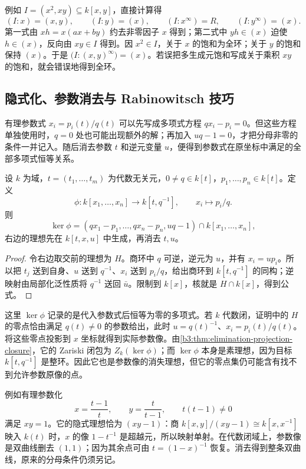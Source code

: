例如 \(I=(x^2,xy)\subseteq k[x,y]\)，直接计算得
\[
	(I:x)=(x,y),\qquad (I:y)=(x),\qquad (I:x^\infty)=R,\qquad (I:y^\infty)=(x).
\]
第一式由 \(xh=x(ax+by)\) 约去非零因子 \(x\) 得到；第二式中 \(yh\in(x)\) 迫使 \(h\in(x)\)，反向由 \(xy\in I\) 得到。因 \(x^2\in I\)，关于 \(x\) 的饱和为全环；关于 \(y\) 的饱和保持 \((x)\)。于是 \(\bigl(I:(x,y)^\infty\bigr)=(x)\)。若误把多生成元饱和写成关于乘积 \(xy\) 的饱和，就会错误地得到全环。

\subsection{隐式化、参数消去与 Rabinowitsch 技巧}
\label{b3:subsec:0803:03}

有理参数式 \(x_i=p_i(t)/q(t)\) 可以先写成多项式方程 \(qx_i-p_i=0\)。但这些方程单独使用时，\(q=0\) 处也可能出现额外的解；再加入 \(uq-1=0\)，才把分母非零的条件一并记入。随后消去参数 \(t\) 和逆元变量 \(u\)，便得到参数式在原坐标中满足的全部多项式恒等关系。

\begin{proposition}[参数映射的隐式理想]\label{b3:prop:parametric-implicit-ideal}
	设 \(k\) 为域，\(t=(t_1,\ldots,t_m)\) 为代数无关元，\(0\ne q\in k[t]\)，\(p_1,\ldots,p_n\in k[t]\)。定义
	\[
		\phi:k[x_1,\ldots,x_n]\longrightarrow k[t,q^{-1}], \qquad x_i\longmapsto p_i/q.
	\]
	则
	\[
		\ker\phi= (qx_1-p_1,\ldots,qx_n-p_n,uq-1)\cap k[x_1,\ldots,x_n],
	\]
	右边的理想先在 \(k[t,x,u]\) 中生成，再消去 \(t,u\)。
\end{proposition}
\begin{proof}
	令右边取交前的理想为 \(H\)。商环中 \(q\) 可逆，逆元为 \(u\)，并有 \(x_i=up_i\)。所以把 \(t_j\) 送到自身、\(u\) 送到 \(q^{-1}\)、\(x_i\) 送到 \(p_i/q\)，给出商环到 \(k[t,q^{-1}]\) 的同构；逆映射由局部化泛性质将 \(q^{-1}\) 送回 \(\bar u\)。限制到 \(k[x]\)，核就是 \(H\cap k[x]\)，得到公式。
\end{proof}

这里 \(\ker\phi\) 记录的是代入参数式后恒等为零的多项式。若 \(k\) 代数闭，证明中的 \(H\) 的零点恰由满足 \(q(t)\ne0\) 的参数给出，此时 \(u=q(t)^{-1}\)、\(x_i=p_i(t)/q(t)\)。将这些零点投影到 \(x\) 坐标就得到实际参数像。由\cref{b3:thm:elimination-projection-closure}，它的 Zariski 闭包为 \(Z_k(\ker\phi)\)；而 \(\ker\phi\) 本身是素理想，因为目标 \(k[t,q^{-1}]\) 是整环。因此它也是参数像的消失理想，但它的零点集仍可能含有找不到允许参数原像的点。

例如有理参数化
\[
	x=\frac{t-1}{t},\qquad y=\frac{t}{t-1},\qquad t(t-1)\ne0
\]
满足 \(xy=1\)。它的隐式理想恰为 \((xy-1)\)：商 \(k[x,y]/(xy-1)\cong k[x,x^{-1}]\) 映入 \(k(t)\) 时，\(x\) 的像 \(1-t^{-1}\) 是超越元，所以映射单射。在代数闭域上，参数像是双曲线删去 \((1,1)\)；因为其余点可由 \(t=(1-x)^{-1}\) 恢复。消去得到整条双曲线，原来的分母条件仍须另记。

